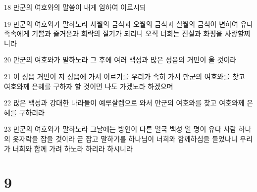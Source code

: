 \par 18 만군의 여호와의 말씀이 내게 임하여 이르시되
\par 19 만군의 여호와가 말하노라 사월의 금식과 오월의 금식과 칠월의 금식이 변하여 유다 족속에게 기쁨과 즐거움과 희락의 절기가 되리니 오직 너희는 진실과 화평을 사랑할찌니라
\par 20 만군의 여호와가 말하노라 그 후에 여러 백성과 많은 성읍의 거민이 올 것이라
\par 21 이 성읍 거민이 저 성읍에 가서 이르기를 우리가 속히 가서 만군의 여호와를 찾고 여호와께 은혜를 구하자 할 것이면 나도 가겠노라 하겠으며
\par 22 많은 백성과 강대한 나라들이 예루살렘으로 와서 만군의 여호와를 찾고 여호와께 은혜를 구하리라
\par 23 만군의 여호와가 말하노라 그날에는 방언이 다른 열국 백성 열 명이 유다 사람 하나의 옷자락을 잡을 것이라 곧 잡고 말하기를 하나님이 너희와 함께하심을 들었나니 우리가 너희와 함께 가려 하노라 하리라 하시니라

\chapter{9}


